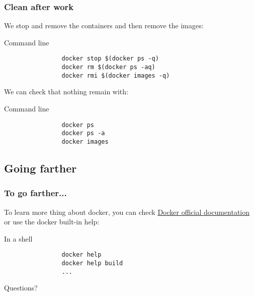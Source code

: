 	\begin{frame}[fragile]
		\frametitle{Clean after work}
		
		We stop and remove the containers and then remove the images:
		\begin{block}{Command line}
			\begin{verbatim}
				docker stop $(docker ps -q)
				docker rm $(docker ps -aq)
				docker rmi $(docker images -q)
			\end{verbatim}
		\end{block}
				
		\bigskip
		We can check that nothing remain with:
		\begin{block}{Command line}
			\begin{verbatim}
				docker ps
				docker ps -a
				docker images
			\end{verbatim}
		\end{block}

	\end{frame}
	
\subsection{Going farther}

	\begin{frame}[fragile]
		\frametitle{To go farther...}
		
		To learn more thing about docker, you can check \href{https://docs.docker.com}{Docker official documentation} or use the docker built-in help:
		
		\begin{block}{In a shell}
			\begin{verbatim}
				docker help
				docker help build
				...
			\end{verbatim}
		\end{block}
	\end{frame}
	
	\begin{frame}
		\begin{center}
			Questions?
		\end{center}
	\end{frame}